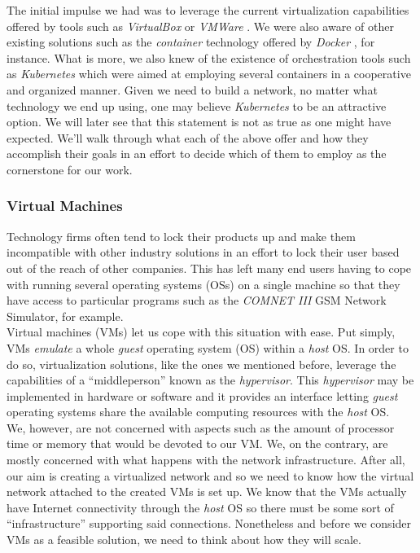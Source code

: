             The initial impulse we had was to leverage the current virtualization capabilities offered by tools such as \textit{VirtualBox} \cite{bib:virtualbox} or \textit{VMWare} \cite{bib:vmware}. We were also aware of other existing solutions such as the \textit{container} technology offered by \textit{Docker} \cite{bib:docker}, for instance. What is more, we also knew of the existence of orchestration tools such as \textit{Kubernetes} \cite{bib:kubernetes} which were aimed at employing several containers in a cooperative and organized manner. Given we need to build a network, no matter what technology we end up using, one may believe \textit{Kubernetes} to be an attractive option. We will later see that this statement is not as true as one might have expected. We'll walk through what each of the above offer and how they accomplish their goals in an effort to decide which of them to employ as the cornerstone for our work.

            \subsubsection{Virtual Machines}
                Technology firms often tend to lock their products up and make them incompatible with other industry solutions in an effort to lock their user based out of the reach of other companies. This has left many end users having to cope with running several operating systems (OSs) on a single machine so that they have access to particular programs such as the \textit{COMNET III} GSM Network Simulator, for example.\\

                Virtual machines (VMs) let us cope with this situation with ease. Put simply, VMs \textit{emulate} a whole \textit{guest} operating system (OS) within a \textit{host} OS. In order to do so, virtualization solutions, like the ones we mentioned before, leverage the capabilities of a ``middleperson'' known as the \textit{hypervisor}. This \textit{hypervisor} may be implemented in hardware or software and it provides an interface letting \textit{guest} operating systems share the available computing resources with the \textit{host} OS.\\

                We, however, are not concerned with aspects such as the amount of processor time or memory that would be devoted to our VM. We, on the contrary, are mostly concerned with what happens with the network infrastructure. After all, our aim is creating a virtualized network and so we need to know how the virtual network attached to the created VMs is set up. We know that the VMs actually have Internet connectivity through the \textit{host} OS so there must be some sort of ``infrastructure'' supporting said connections. Nonetheless and before we consider VMs as a feasible solution, we need to think about how they will scale.\\

